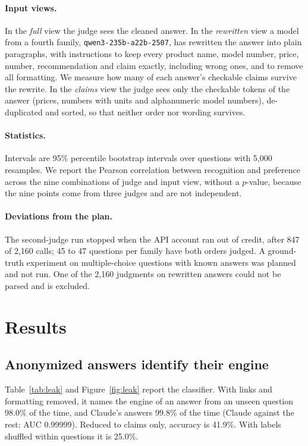 \documentclass{article}
\begin{document}
\paragraph{Input views.} In the \emph{full} view the judge sees the cleaned answer. In the \emph{rewritten} view a model from a fourth family, \texttt{qwen3-235b-a22b-2507}, has rewritten the answer into plain paragraphs, with instructions to keep every product name, model number, price, number, recommendation and claim exactly, including wrong ones, and to remove all formatting. We measure how many of each answer's checkable claims survive the rewrite. In the \emph{claims} view the judge sees only the checkable tokens of the answer (prices, numbers with units and alphanumeric model numbers), de-duplicated and sorted, so that neither order nor wording survives.

\paragraph{Statistics.} Intervals are 95\% percentile bootstrap intervals over questions with 5,000 resamples. We report the Pearson correlation between recognition and preference across the nine combinations of judge and input view, without a $p$-value, because the nine points come from three judges and are not independent.

\paragraph{Deviations from the plan.} The second-judge run stopped when the API account ran out of credit, after 847 of 2,160 calls; 45 to 47 questions per family have both orders judged. A ground-truth experiment on multiple-choice questions with known answers was planned and not run. One of the 2,160 judgments on rewritten answers could not be parsed and is excluded.

\section{Results}
\label{sec:results}

\subsection{Anonymized answers identify their engine}
\label{sec:leak}

Table~\ref{tab:leak} and Figure~\ref{fig:leak} report the classifier. With links and formatting removed, it names the engine of an answer from an unseen question 98.0\% of the time, and Claude's answers 99.8\% of the time (Claude against the rest: AUC 0.99999). Reduced to claims only, accuracy is 41.9\%. With labels shuffled within questions it is 25.0\%.
\end{document}
